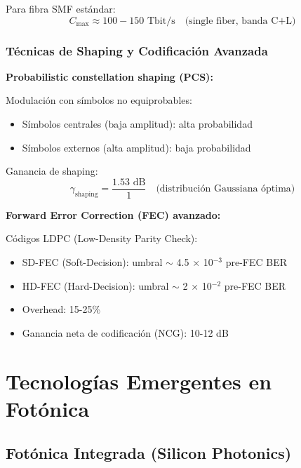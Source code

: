 \documentclass[11pt,a4paper]{article}
\begin{document}
Para fibra SMF estándar:
\begin{equation}
    C_{\max} \approx 100-150 \text{ Tbit/s} \quad \text{(single fiber, banda C+L)}
\end{equation}

\subsubsection{Técnicas de Shaping y Codificación Avanzada}

\textbf{Probabilistic constellation shaping (PCS):}

Modulación con símbolos no equiprobables:
\begin{itemize}
    \item Símbolos centrales (baja amplitud): alta probabilidad
    \item Símbolos externos (alta amplitud): baja probabilidad
\end{itemize}

Ganancia de shaping:
\begin{equation}
    \gamma_{\text{shaping}} = \frac{1.53 \text{ dB}}{1} \quad \text{(distribución Gaussiana óptima)}
\end{equation}

\textbf{Forward Error Correction (FEC) avanzado:}

Códigos LDPC (Low-Density Parity Check):
\begin{itemize}
    \item SD-FEC (Soft-Decision): umbral $\sim$ 4.5 × 10$^{-3}$ pre-FEC BER
    \item HD-FEC (Hard-Decision): umbral $\sim$ 2 × 10$^{-2}$ pre-FEC BER
    \item Overhead: 15-25\%
    \item Ganancia neta de codificación (NCG): 10-12 dB
\end{itemize}

\section{Tecnologías Emergentes en Fotónica}

\subsection{Fotónica Integrada (Silicon Photonics)}
\end{document}
